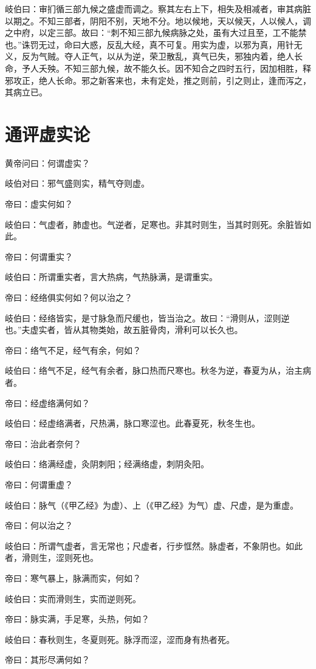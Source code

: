 \documentclass{article}%
\begin{document}
岐伯曰：审扪循三部九候之盛虚而调之。察其左右上下，相失及相减者，审其病脏以期之。不知三部者，阴阳不别，天地不分。地以候地，天以候天，人以候人，调之中府，以定三部。故曰：“刺不知三部九候病脉之处，虽有大过且至，工不能禁也。”诛罚无过，命曰大惑，反乱大经，真不可复。用实为虚，以邪为真，用针无义，反为气贼。夺人正气，以从为逆，荣卫散乱，真气已失，邪独内着，绝人长命，予人夭殃。不知三部九候，故不能久长。因不知合之四时五行，因加相胜，释邪攻正，绝人长命。邪之新客来也，未有定处，推之则前，引之则止，逢而泻之，其病立已。
\section{通评虚实论}
黄帝问曰：何谓虚实？

岐伯对曰：邪气盛则实，精气夺则虚。

帝曰：虚实何如？

岐伯曰：气虚者，肺虚也。气逆者，足寒也。非其时则生，当其时则死。余脏皆如此。

帝曰：何谓重实？

岐伯曰：所谓重实者，言大热病，气热脉满，是谓重实。

帝曰：经络俱实何如？何以治之？

岐伯曰：经络皆实，是寸脉急而尺缓也，皆当治之。故曰：“滑则从，涩则逆也。”夫虚实者，皆从其物类始，故五脏骨肉，滑利可以长久也。

帝曰：络气不足，经气有余，何如？

岐伯曰：络气不足，经气有余者，脉口热而尺寒也。秋冬为逆，春夏为从，治主病者。

帝曰：经虚络满何如？

岐伯曰：经虚络满者，尺热满，脉口寒涩也。此春夏死，秋冬生也。

帝曰：治此者奈何？

岐伯曰：络满经虚，灸阴刺阳；经满络虚，刺阴灸阳。

帝曰：何谓重虚？

岐伯曰：脉气（《甲乙经》为虚）、上（《甲乙经》为气）虚、尺虚，是为重虚。

帝曰：何以治之？

岐伯曰：所谓气虚者，言无常也；尺虚者，行步恇然。脉虚者，不象阴也。如此者，滑则生，涩则死也。

帝曰：寒气暴上，脉满而实，何如？

岐伯曰：实而滑则生，实而逆则死。

帝曰：脉实满，手足寒，头热，何如？

岐伯曰：春秋则生，冬夏则死。脉浮而涩，涩而身有热者死。

帝曰：其形尽满何如？
\end{document}
